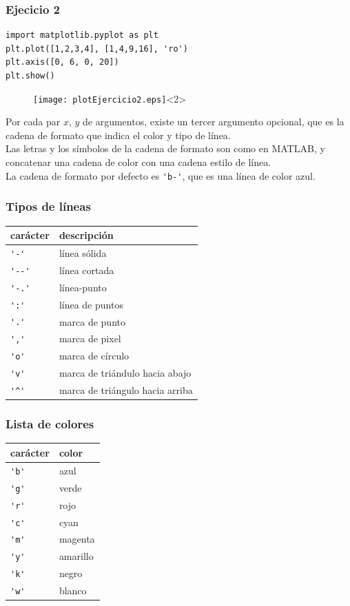 \begin{frame}[fragile]
\frametitle{Ejecicio 2}
\begin{lstlisting}
import matplotlib.pyplot as plt
plt.plot([1,2,3,4], [1,4,9,16], 'ro')
plt.axis([0, 6, 0, 20])
plt.show()
\end{lstlisting}
\begin{figure}
	\centering
	\texttt{[image: plotEjercicio2.eps]}<2> 
\end{figure}
\end{frame}
\begin{frame}[fragile]
Por cada par $x$, $y$ de argumentos, existe un tercer argumento opcional, que es la cadena de formato que indica el color y tipo de línea.
\\
\medskip
Las letras y los símbolos de la cadena de formato son como en MATLAB, y concatenar una cadena de color con una cadena estilo de línea.
\\
\medskip
La cadena de formato por defecto es \verb|'b-'|, que es una línea de color azul.
\end{frame}
\begin{frame}[fragile]
\frametitle{Tipos de líneas}
\begin{tabular}{l | l}
carácter & descripción \\ \hline
\verb|'-'|	& línea sólida \\ \hline
\verb|'--'| & línea cortada \\ \hline
\verb|'-.'| & línea-punto \\ \hline
\verb|':'|	& línea de puntos \\ \hline
\verb|'.'|	& marca de punto \\ \hline
\verb|','|	& marca de pixel \\ \hline
\verb|'o'|	& marca de círculo \\ \hline
\verb|'v'|	& marca de triándulo hacia abajo \\ \hline
\verb|'^'|	& marca de triángulo hacia arriba
\end{tabular}
\end{frame}
\begin{frame}[fragile]
\frametitle{Lista de colores}
\begin{tabular}{l | l}
carácter & color \\ \hline
\verb|'b'| & azul \\ \hline
\verb|'g'| & verde \\ \hline
\verb|'r'| & rojo \\ \hline
\verb|'c'| & cyan \\ \hline
\verb|'m'| & magenta \\ \hline
\verb|'y'| & amarillo \\ \hline
\verb|'k'| & negro \\ \hline
\verb|'w'| & blanco
\end{tabular}
\end{frame}
